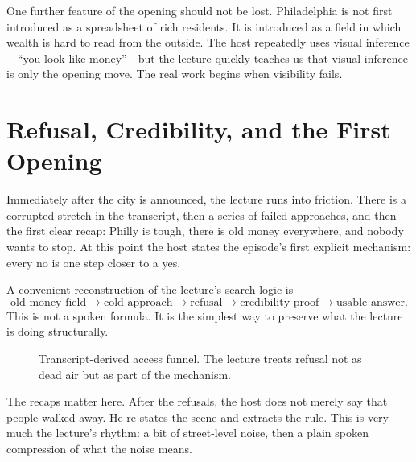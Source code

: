 One further feature of the opening should not be lost. Philadelphia is not first introduced as a spreadsheet of rich residents. It is introduced as a field in which wealth is hard to read from the outside. The host repeatedly uses visual inference---``you look like money''---but the lecture quickly teaches us that visual inference is only the opening move. The real work begins when visibility fails.

\section{Refusal, Credibility, and the First Opening}

Immediately after the city is announced, the lecture runs into friction. There is a corrupted stretch in the transcript, then a series of failed approaches, and then the first clear recap: Philly is tough, there is old money everywhere, and nobody wants to stop. At this point the host states the episode's first explicit mechanism: every no is one step closer to a yes.

A convenient reconstruction of the lecture's search logic is
\begin{equation}
\text{old-money field}
\to
\text{cold approach}
\to
\text{refusal}
\to
\text{credibility proof}
\to
\text{usable answer}.
\end{equation}
This is not a spoken formula. It is the simplest way to preserve what the lecture is doing structurally.

\begin{figure}[h]
\centering
{}
\caption{Transcript-derived access funnel. The lecture treats refusal not as dead air but as part of the mechanism.}
\end{figure}

The recaps matter here. After the refusals, the host does not merely say that people walked away. He re-states the scene and extracts the rule. This is very much the lecture's rhythm: a bit of street-level noise, then a plain spoken compression of what the noise means.

